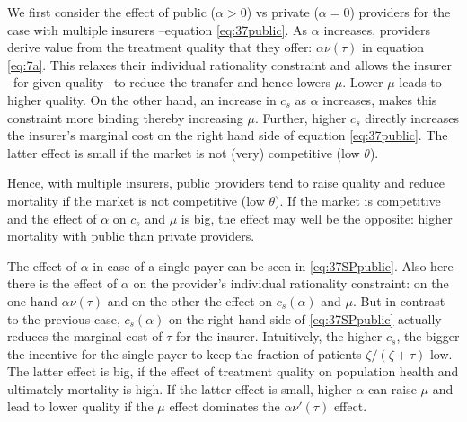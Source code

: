 \documentclass[a4paper,12pt]{article}
\begin{document}
We first consider the effect of public (\(\alpha>0\)) vs private (\(\alpha=0\)) providers for the case with multiple insurers --equation \eqref{eq:37public}. As \(\alpha\) increases, providers derive value from the treatment quality that they offer: \(\alpha \nu(\tau)\) in equation \eqref{eq:7a}. This relaxes their individual rationality constraint and allows the insurer --for given quality-- to reduce the transfer and hence lowers \(\mu\). Lower \(\mu\) leads to higher quality. On the other hand, an increase in \(c_s\) as \(\alpha\) increases, makes this constraint more binding thereby increasing \(\mu\). Further, higher \(c_s\) directly increases the insurer's marginal cost on the right hand side of equation \eqref{eq:37public}. The latter effect is small if the market is not (very) competitive (low \(\theta\)).

Hence, with multiple insurers, public providers tend to raise quality and reduce mortality if the market is not competitive (low \(\theta\)). If the market is competitive and the effect of \(\alpha\) on \(c_s\) and \(\mu\) is big, the effect may well be the opposite: higher mortality with public than private providers.

The effect of \(\alpha\) in case of a single payer can be seen in \eqref{eq:37SPpublic}. Also here there is the effect of \(\alpha\) on the provider's individual rationality constraint: on the one hand \(\alpha \nu(\tau)\) and on the other the effect on \(c_s(\alpha)\) and \(\mu\). But in contrast to the previous case, \(c_s(\alpha)\) on the right hand side of \eqref{eq:37SPpublic} actually reduces the marginal cost of \(\tau\) for the insurer. Intuitively, the higher \(c_s\), the bigger the incentive for the single payer to keep the fraction of patients \(\zeta/(\zeta+\tau)\) low. The latter effect is big, if the effect of treatment quality on population health and ultimately mortality is high. If the latter effect is small, higher \(\alpha\) can raise \(\mu\) and lead to lower quality if the \(\mu\) effect dominates the \(\alpha \nu'(\tau)\) effect.
\end{document}
